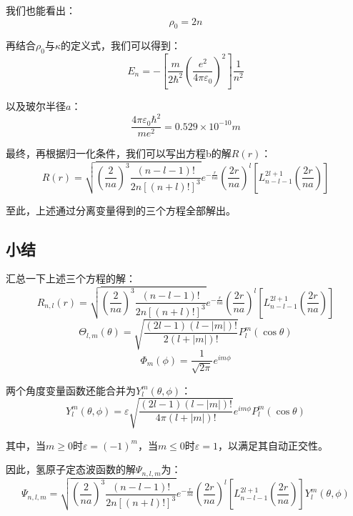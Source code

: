 我们也能看出：
\[\rho_0=2n\]

再结合$\rho_0$与$\kappa$的定义式，我们可以得到：
\[E_n=- \left [\frac{m}{2\hbar^2} \left ( \frac{e^2}{4 \pi \varepsilon_0} \right )^2 \right ] \frac{1}{n^2}\]

以及玻尔半径$a$：
\[\frac{4 \pi \varepsilon_0 \hbar^2}{me^2}=0.529 \times 10^{-10}m\]

最终，再根据归一化条件，我们可以写出方程b的解$R(r)$：
\[R(r)=\sqrt{ \left (\frac{2}{na} \right )^3 \frac{(n-l-1)!}{2n[(n+l)!]^3}}e^{-\frac{r}{na}}\left (\frac{2r}{na} \right )^l \left [L_{n-l-1}^{2l+1} \left ( \frac{2r}{na} \right ) \right ]\]

至此，上述通过分离变量得到的三个方程全部解出。

\subsection{小结}
汇总一下上述三个方程的解：
\[R_{n,l}(r)=\sqrt{ \left (\frac{2}{na} \right )^3 \frac{(n-l-1)!}{2n[(n+l)!]^3}}e^{-\frac{r}{na}}\left (\frac{2r}{na} \right )^l \left [L_{n-l-1}^{2l+1} \left ( \frac{2r}{na} \right ) \right ]\]
\[\Theta_{l,m}(\theta)=\sqrt{\frac{(2l-1)(l-|m|)!}{2(l+|m|)!}}P^{m}_l(\cos\theta)\]
\[\varPhi_{m}(\phi)=\frac{1}{\sqrt{2\pi}}e^{im\phi}\]

两个角度变量函数还能合并为$Y_l^m(\theta,\phi)$：
\[Y_l^m(\theta,\phi)=\varepsilon \sqrt{\frac{(2l-1)(l-|m|)!}{4 \pi (l+|m|)!}}e^{im\phi}P^{m}_l(\cos\theta)\]

其中，当$m \geq 0$时$\varepsilon=(-1)^m$，当$m \leq 0$时$\varepsilon=1$，以满足其自动正交性。

因此，氢原子定态波函数的解$\varPsi_{n,l,m}$为：
\[\varPsi_{n,l,m}=\sqrt{ \left (\frac{2}{na} \right )^3 \frac{(n-l-1)!}{2n[(n+l)!]^3}}e^{-\frac{r}{na}}\left (\frac{2r}{na} \right )^l \left [L_{n-l-1}^{2l+1} \left ( \frac{2r}{na} \right ) \right ]Y_l^m(\theta,\phi)\]